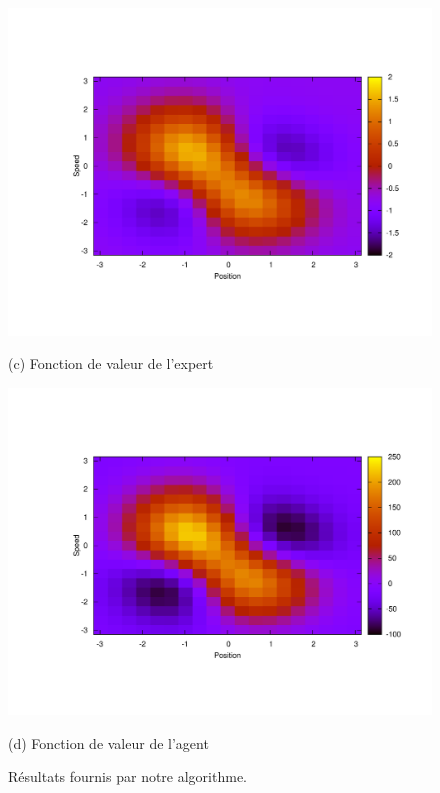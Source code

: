 \documentclass[publibook-draft]{CAp2012}
\begin{document}
\begin{figure}[tb]
\begin{minipage}[b]{.5\linewidth}
  \centerline{\includegraphics[width=1.2\linewidth]{LAFEM_Exp3_Vexpert.pdf}}
  \centerline{(c) Fonction de valeur de l'expert}%
\end{minipage}
\hfill
\begin{minipage}[b]{.5\linewidth}
  \centering
  \centerline{\includegraphics[width=1.2\linewidth]{LAFEM_Exp3_Vagent.pdf}}
  \centerline{(d) Fonction de valeur de l'agent}%
\end{minipage}
%
\caption{Résultats fournis par notre algorithme.}
\label{onlyFig.fig}
%
\vspace{-5pt}
\end{figure}
\end{document}
